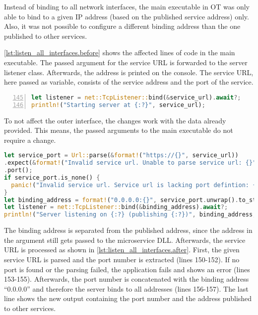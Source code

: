 Instead of binding to all network interfaces, the main executable in \ac{OT} was only able to bind to a given \ac{IP} address (based on the published service address) only. Also, it was not possible to configure a different binding address than the one published to other services.

\autoref{lst:listen_all_interfaces.before} shows the affected lines of code in the main executable. The passed argument for the service \ac{URL} is forwarded to the server listener class. Afterwards, the address is printed on the console. The service \ac{URL}, here passed as variable, consists of the service address and the port of the service.
\begin{lstlisting}[label=lst:listen_all_interfaces.before, caption={Listener binding before the applied changes (\textit{Microservices/OpenTwin/src/main.rs})}, language=rust, firstnumber=145, numbers=left]
let listener = net::TcpListener::bind(&service_url).await?;
println!("Starting server at {:?}", service_url);
\end{lstlisting}

To not affect the outer interface, the changes work with the data already provided. This means, the passed arguments to the main executable do not require a change.
\begin{lstlisting}[label=lst:listen_all_interfaces.after, caption={Listener binding after the applied changes. The service url is parsed, based on its port. Binding is done on all interfaces. (\textit{Microservices/OpenTwin/src/main.rs})}, language=rust, firstnumber=150]
let service_port = Url::parse(&format!("https://{}", service_url))
.expect(&format!("Invalid service url. Unable to parse service url: {}", service_url))
.port();
if service_port.is_none() {
  panic!("Invalid service url. Service url is lacking port defintion: {}", service_url);
}
let binding_address = format!("0.0.0.0:{}", service_port.unwrap().to_string());
let listener = net::TcpListener::bind(&binding_address).await?;
println!("Server listening on {:?} (publishing {:?})", binding_address, service_url);
\end{lstlisting}
The binding address is separated from the published address, since the address in the argument still gets passed to the microservice \ac{DLL}. Afterwards, the service \ac{URL} is processed as shown in \autoref{lst:listen_all_interfaces.after}. First, the given service \ac{URL} is parsed and the port number is extracted (lines 150-152). If no port is found or the parsing failed, the application fails and shows an error (lines 153-155). Afterwards, the port number is concatenated with the binding address \enquote{0.0.0.0} and therefore the server binds to all addresses (lines 156-157). The last line shows the new output containing the port number and the address published to other services.

